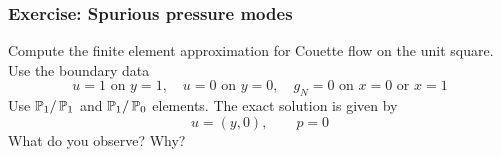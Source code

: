 \begin{frame}
    \frametitle{Exercise: Spurious pressure modes}

    Compute the finite element approximation for Couette
    flow on the unit square. Use the boundary data
    \begin{equation*}
      u = 1  \text{ on } y = 1, \quad
      u = 0  \text{ on } y = 0, \quad
      g_N = 0  \text{ on } x = 0 \text{ or } x = 1
    \end{equation*}
    Use $\mathbb{P}_1 /\,\mathbb{P}_1$ and $\mathbb{P}_1 /\, \mathbb{P}_0$
    elements. The exact solution is given by
    \[
    u = (y,0), \qquad p = 0
    \]
    What do you observe? Why?
\end{frame}

